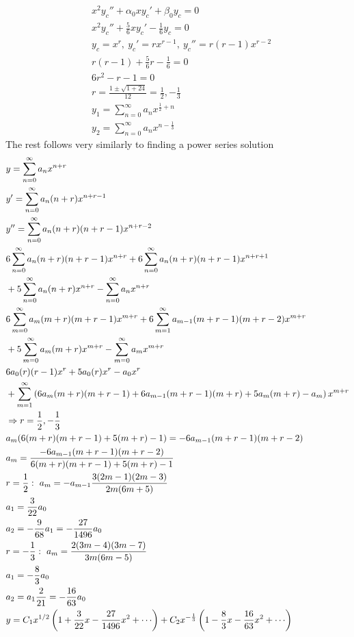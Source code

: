 \documentclass[11pt, fleqn]{article}
\begin{document}
\begin{align*}
    &x^2y_c''+\alpha_0 x y_c'+\beta_0 y_c=0\\
    &x^2y_c''+\frac{5}{6}xy_c'-\frac{1}{6}y_c=0\\
    &y_c=x^r,\ y_c'=rx^{r-1},\ y_c''=r(r-1)x^{r-2}\\
    &r(r-1)+\frac{5}{6}r-\frac{1}{6}=0\\
    &6r^2-r-1=0\\
    &r=\frac{1\pm\sqrt{1+24}}{12}=\frac{1}{2},-\frac{1}{3}\\
    &y_1=\sum_{n=0}^\infty a_nx^{\frac{1}{2}+n}\\
    &y_2=\sum_{n=0}^\infty a_nx^{n-\frac{1}{3}}
\end{align*}
The rest follows very similarly to finding a power series solution
\begin{align*}
    &y=\sum_{n=0}^\infty a_nx^{n+r}\\
    &y'=\sum_{n=0}^\infty a_n(n+r)x^{n+r-1}\\
    &y''=\sum_{n=0}^\infty a_n(n+r)(n+r-1)x^{n+r-2}\\
    &6\sum_{n=0}^\infty a_n(n+r)(n+r-1)x^{n+r}+6\sum_{n=0}^\infty a_n(n+r)(n+r-1)x^{n+r+1}\\
    &+5\sum_{n=0}^\infty a_n(n+r)x^{n+r}-\sum_{n=0}^\infty a_nx^{n+r}\\
    &6\sum_{m=0}^\infty a_m(m+r)(m+r-1)x^{m+r}+6\sum_{m=1}^\infty a_{m-1}(m+r-1)(m+r-2)x^{m+r}\\
    &+5\sum_{m=0}^\infty a_m(m+r)x^{m+r}-\sum_{m=0}^\infty a_{m}x^{m+r}\\
    &6a_0(r)(r-1)x^r+5a_0(r)x^r-a_0x^r\\
    &+\sum_{m=1}^\infty\brround{6a_m(m+r)(m+r-1)+6a_{m-1}(m+r-1)(m+r)+5a_m(m+r)-a_{m}}x^{m+r}\\
    &\Ra r=\frac{1}{2},-\frac{1}{3}\\
    &a_m(6(m+r)(m+r-1)+5(m+r)-1)=-6a_{m-1}(m+r-1)(m+r-2)\\
    &a_m=\frac{-6a_{m-1}(m+r-1)(m+r-2)}{6(m+r)(m+r-1)+5(m+r)-1}\\
    &r=\frac{1}{2}:\ a_m=-a_{m-1}\frac{3(2m-1)(2m-3)}{2m(6m+5)}\\
    &a_1=\frac{3}{22}a_0\\
    &a_2=-\frac{9}{68}a_1=-\frac{27}{1496}a_0\\
    &r=-\frac{1}{3}:\ a_m=\frac{2(3m-4)(3m-7)}{3m(6m-5)}\\
    &a_1=-\frac{8}{3}a_0\\
    &a_2=a_1\frac{2}{21}=-\frac{16}{63}a_0\\
    &y=C_1x^{1/2}\brround{1+\frac{3}{22}x-\frac{27}{1496}x^2+\cdots}+C_2x^{-\frac{1}{3}}\brround{1-\frac{8}{3}x-\frac{16}{63}x^2+\cdots}
\end{align*}
\end{document}

